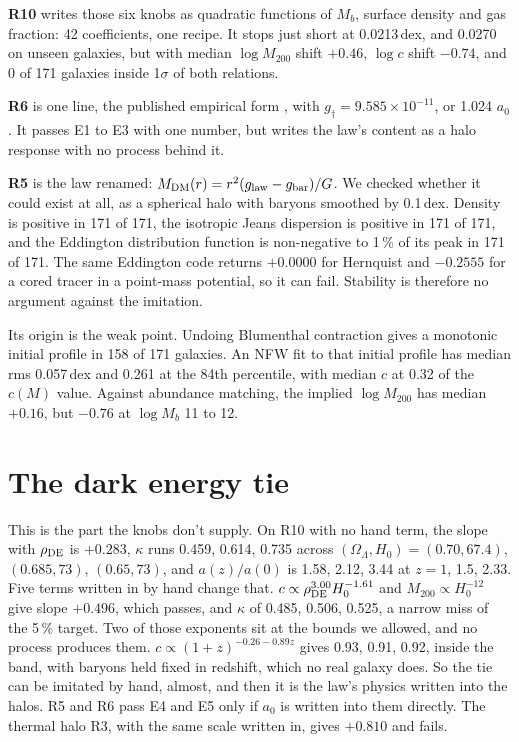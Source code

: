 \documentclass[11pt]{article}
\begin{document}
\textbf{R10} writes those six knobs as quadratic functions of $M_b$, surface density and gas fraction: 42 coefficients, one recipe. It stops just short at 0.0213\,dex, and 0.0270 on unseen galaxies, but with median $\log M_{200}$ shift $+0.46$, $\log c$ shift $-0.74$, and 0 of 171 galaxies inside 1$\sigma$ of both relations.

\textbf{R6} is one line, the published empirical form \cite{mcgaugh16}, with $g_\dagger=9.585\times10^{-11}$, or 1.024 $a_0$. It passes E1 to E3 with one number, but writes the law's content as a halo response with no process behind it.

\textbf{R5} is the law renamed: $M_{\rm DM}(r)=r^2(g_{\rm law}-g_{\rm bar})/G$. We checked whether it could exist at all, as a spherical halo with baryons smoothed by 0.1\,dex. Density is positive in 171 of 171, the isotropic Jeans dispersion is positive in 171 of 171, and the Eddington distribution function is non-negative to 1\,\% of its peak in 171 of 171. The same Eddington code returns $+0.0000$ for Hernquist and $-0.2555$ for a cored tracer in a point-mass potential, so it can fail. Stability is therefore no argument against the imitation.

Its origin is the weak point. Undoing Blumenthal contraction gives a monotonic initial profile in 158 of 171 galaxies. An NFW fit to that initial profile has median rms 0.057\,dex and 0.261 at the 84th percentile, with median $c$ at 0.32 of the $c(M)$ value. Against abundance matching, the implied $\log M_{200}$ has median $+0.16$, but $-0.76$ at $\log M_b$ 11 to 12.

\section{The dark energy tie}
This is the part the knobs don't supply. On R10 with no hand term, the slope with $\rho_{\rm DE}$ is $+0.283$, $\kappa$ runs 0.459, 0.614, 0.735 across $(\Omega_\Lambda,H_0)=(0.70,67.4)$, $(0.685,73)$, $(0.65,73)$, and $a(z)/a(0)$ is 1.58, 2.12, 3.44 at $z=1$, 1.5, 2.33. Five terms written in by hand change that. $c\propto\rho_{\rm DE}^{3.00}H_0^{-1.61}$ and $M_{200}\propto H_0^{-12}$ give slope $+0.496$, which passes, and $\kappa$ of 0.485, 0.506, 0.525, a narrow miss of the 5\,\% target. Two of those exponents sit at the bounds we allowed, and no process produces them. $c\propto(1+z)^{-0.26-0.89z}$ gives 0.93, 0.91, 0.92, inside the band, with baryons held fixed in redshift, which no real galaxy does. So the tie can be imitated by hand, almost, and then it is the law's physics written into the halos. R5 and R6 pass E4 and E5 only if $a_0$ is written into them directly. The thermal halo R3, with the same scale written in, gives $+0.810$ and fails.
\end{document}
